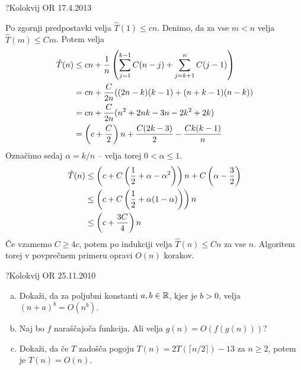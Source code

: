 \begin{naloga}{?}{Kolokvij OR 17.4.2013}
\begin{odgovor}
Po zgornji predpostavki velja $\hat{T}(1) \le cn$.
Denimo, da za vse $m < n$ velja $\hat{T}(m) \le Cm$.
Potem velja
\begin{align*}
\hat{T}(n) &\le cn +
{1 \over n} \left(\sum_{j=1}^{k-1} C(n-j) +
\sum_{j=k+1}^n C(j-1) \right) \\
&= cn + {C \over 2n} ((2n-k)(k-1) + (n+k-1)(n-k)) \\
&= cn + {C \over 2n} (n^2 + 2nk - 3n - 2k^2 + 2k) \\
&= \left(c + {C \over 2}\right) n + {C(2k - 3) \over 2} - {Ck(k-1) \over n}
\end{align*}
Označimo sedaj $\alpha = k/n$ -- velja torej $0 < \alpha \le 1$.
\begin{align*}
\hat{T}(n) &\le
\left(c + C \left({1 \over 2} + \alpha - \alpha^2\right) \right) n
+ C \left(\alpha - {3 \over 2}\right) \\
&\le \left(c + C \left({1 \over 2} + \alpha (1 - \alpha)\right) \right) n \\
&\le \left(c + {3C \over 4} \right) n
\end{align*}
Če vzamemo $C \ge 4c$,
potem po indukciji velja $\hat{T}(n) \le Cn$ za vse $n$.
Algoritem torej v povprečnem primeru opravi $O(n)$ korakov.
\end{odgovor}
\end{naloga}

\begin{naloga}{?}{Kolokvij OR 25.11.2010}
\begin{vprasanje}
\begin{enumerate}[(a)]
\item Dokaži, da za poljubni konstanti $a, b \in \mathbb{R}$, kjer je $b > 0$,
velja ${(n + a)}^b = O(n^b)$.

\item Naj bo $f$ naraščajoča funkcija.
Ali velja $g(n) = O(f(g(n)))$?

\item Dokaži,
da če $T$ zadošča pogoju $T(n) = 2T(\lceil n/2 \rceil) - 13$ za $n \ge 2$,
potem je $T(n) = O(n)$.
\end{enumerate}
\end{vprasanje}
\begin{odgovor}
\end{odgovor}
\end{naloga}


